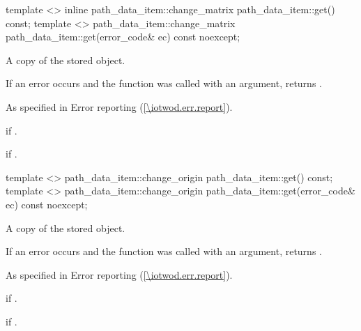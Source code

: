 \begin{itemdecl}
template <>
inline path_data_item::change_matrix path_data_item::get() const;
template <>
path_data_item::change_matrix path_data_item::get(error_code& ec) const 
noexcept;
\end{itemdecl}
\begin{itemdescr}
\pnum
\returns
A copy of the stored  object.

\pnum
If an error occurs and the function was called with an  argument, returns .

\pnum
\throws
As specified in Error reporting (\ref{\iotwod.err.report}).

\pnum
\errors
{} if .

\pnum
{} if .
\end{itemdescr}

\begin{itemdecl}
template <>
path_data_item::change_origin path_data_item::get() const;
template <>
path_data_item::change_origin path_data_item::get(error_code& ec) const 
  noexcept;
\end{itemdecl}
\begin{itemdescr}
\pnum
\returns
A copy of the stored  object.

\pnum
If an error occurs and the function was called with an  argument, returns .

\pnum
\throws
As specified in Error reporting (\ref{\iotwod.err.report}).

\pnum
\errors
{} if .

\pnum
{} if .
\end{itemdescr}

